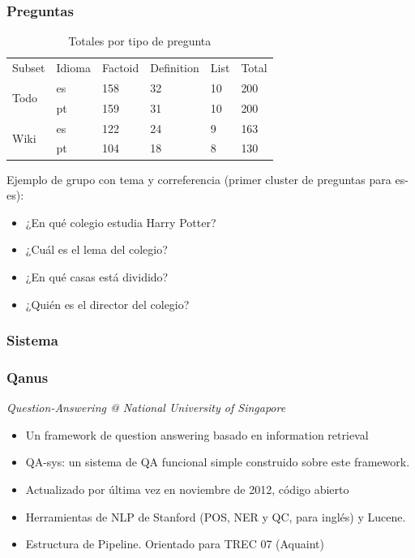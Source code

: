 \begin{frame}
\frametitle{Preguntas}
  \begin{center}
  \begin{table}
  \centering
  \begin{tabular}{| l | l | l | l | l | l |}
  
  Subset & Idioma & Factoid & Definition & List & Total \\ 
  \multirow{2}{*}{Todo} & es & 158 & 32 & 10 & 200 \\ 
   & pt & 159 & 31 & 10 & 200 \\ \hline
   \multirow{2}{*}{Wiki} & es & 122 & 24 & 9 & 163 \\ 
   & pt & 104 & 18 & 8 & 130 \\ 
  \end{tabular}
  \caption{Totales por tipo de pregunta}
  \label{table:totals-type-question}
  \end{table}
  \end{center}

  Ejemplo de grupo con tema y correferencia (primer cluster de preguntas para es-es):
  \begin{itemize}
  \item ¿En qué colegio estudia Harry Potter?
  \item ¿Cuál es el lema del colegio?
  \item ¿En qué casas está dividido?
  \item ¿Quién es el director del colegio?
  \end{itemize}

\end{frame}


\subsubsection*{Sistema}

\begin{frame}
\frametitle{Qanus}
  \textit{Question-Answering @ National University of Singapore}
  \begin{itemize}
    \item Un framework de question answering basado en information retrieval
    \item QA-sys: un sistema de QA funcional simple construido sobre este framework. 
    \item Actualizado por última vez en noviembre de 2012, código abierto
    \item Herramientas de NLP de Stanford (POS, NER y QC, para inglés) y Lucene. 
    \item Estructura de Pipeline. Orientado para TREC 07 (Aquaint)
  \end{itemize}
\end{frame}

